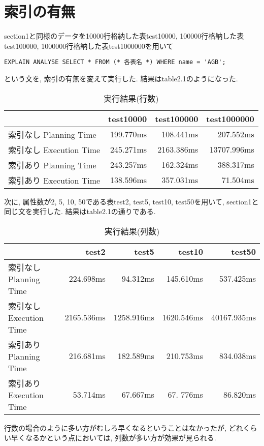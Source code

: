 \documentclass{jarticle}
\begin{document}
\section{索引の有無}
section1と同様のデータを10000行格納した表test10000, 100000行格納した表test100000, 1000000行格納した表test1000000を用いて
\begin{verbatim}
EXPLAIN ANALYSE SELECT * FROM (* 各表名 *) WHERE name = 'AGB';
\end{verbatim}
という文を, 索引の有無を変えて実行した. 結果はtable2.1のようになった.
\begin{table}[htbp]
  \begin{tabular}{|l||r|r|r|} \hline
  & test10000 & test100000 & test1000000 \\ \hline \hline
  索引なし Planning Time & 199.770ms & 108.441ms & 207.552ms \\ \hline
  索引なし Execution Time & 245.271ms & 2163.386ms & 13707.996ms \\ \hline
  索引あり Planning Time & 243.257ms & 162.324ms & 388.317ms \\ \hline
  索引あり Execution Time & 138.596ms & 357.031ms & 71.504ms \\ \hline
  \end{tabular}
  \centering
  \caption{実行結果(行数)}
\end{table}
次に, 属性数が2, 5, 10, 50である表test2, test5, test10, test50を用いて, section1と同じ文を実行した. 結果はtable2.1の通りである.
\begin{table}[htbp]
  \begin{tabular}{|l||r|r|r|r|} \hline
  & test2 & test5 & test10 & test50 \\ \hline \hline
  索引なし Planning Time & 224.698ms & 94.312ms & 145.610ms & 537.425ms \\ \hline
  索引なし Execution Time & 2165.536ms & 1258.916ms & 1620.546ms & 40167.935ms \\ \hline
  索引あり Planning Time & 216.681ms & 182.589ms & 210.753ms & 834.038ms \\ \hline
  索引あり Execution Time & 53.714ms & 67.667ms & 67. 776ms & 86.820ms \\ \hline
  \end{tabular}
  \centering
  \caption{実行結果(列数)}
\end{table}
行数の場合のように多い方がむしろ早くなるということはなかったが, どれくらい早くなるかという点においては, 列数が多い方が効果が見られる.
\end{document}
